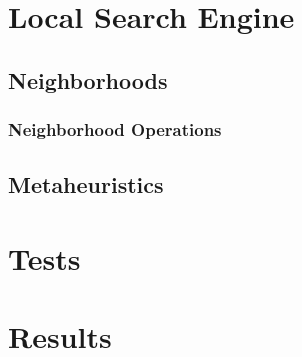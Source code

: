\documentclass[a4paper,12pt]{article}
\begin{document}
\section{Local Search Engine}
  \subsection{Neighborhoods}
    \subsubsection{Neighborhood Operations}
  \subsection{Metaheuristics}
\section{Tests}
\section{Results}
\end{document}
